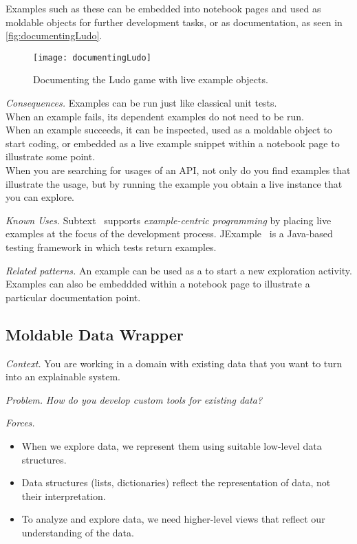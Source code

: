 \documentclass[sigconf,screen]{acmart}
\newcommand\ws[1]{\nbe{Workshop}{#1}{teal}} %
\newcommand{\pattern}[2]{\needlines{10}
\subsection*{#1}\label{pat:#2}}
\newcommand{\patref}[1]{\emph{\nameref{pat:#1}}\xspace}
\newcommand{\patsec}[1]{\noindent\textit{#1.}\xspace}
\begin{document}
Examples such as these can be embedded into notebook pages and used as moldable objects for further development tasks, or as documentation, as seen in \autoref{fig:documentingLudo}.

\begin{figure}[h]
  \texttt{[image: documentingLudo]}
  \caption{Documenting the Ludo game with live example objects.}
  \label{fig:documentingLudo}
\end{figure}

    
\patsec{Consequences}
Examples can be run just like classical unit tests.\\
When an example fails, its dependent examples do not need to be run.\\
When an example succeeds, it can be inspected, used as a moldable object to start coding, or embedded as a live example snippet within a notebook page to illustrate some point.\\
When you are searching for usages of an API, not only do you find examples that illustrate the usage, but by running the example you obtain a live instance that you can explore.

\patsec{Known Uses}
Subtext~\cite{Edwa04a} supports \emph{example-centric programming} by placing live examples at the focus of the development process.
JExample~\cite{Kuhn08a} is a Java-based testing framework in which tests return examples.

\patsec{Related patterns}
An example can be used as a \patref{MoldableObject} to start a new exploration activity.
Examples can also be embeddded within a \patref{ProjectDiary} notebook page to illustrate a particular documentation point.

\pattern{Moldable Data Wrapper}{MoldableDataWrapper}


\patsec{Context}
You are working in a domain with existing data that you want to turn into an explainable system.

\patsec{Problem}
\emph{How do you develop custom tools for existing data?}

\patsec{Forces}
\begin{itemize}[---]
\item When we explore data, we represent them using suitable low-level data structures.
\item Data structures (lists, dictionaries) reflect the representation of data, not their interpretation.
\item To analyze and explore data, we need higher-level views that reflect our understanding of the data.
\end{itemize}
\end{document}

